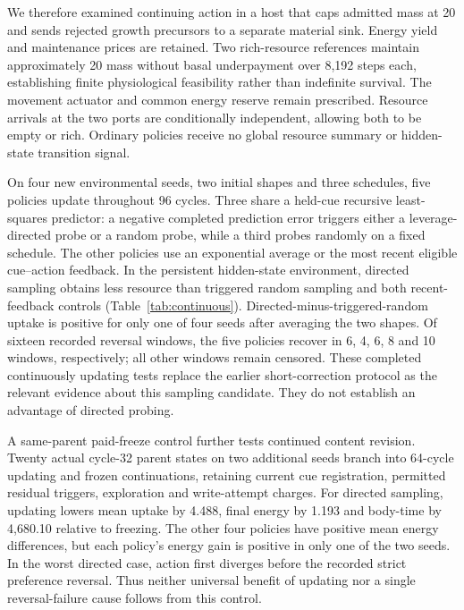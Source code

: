 We therefore examined continuing action in a host that caps admitted mass at 20 and sends rejected growth precursors to a separate material sink. Energy yield and maintenance prices are retained. Two rich-resource references maintain approximately 20 mass without basal underpayment over 8,192 steps each, establishing finite physiological feasibility rather than indefinite survival. The movement actuator and common energy reserve remain prescribed. Resource arrivals at the two ports are conditionally independent, allowing both to be empty or rich. Ordinary policies receive no global resource summary or hidden-state transition signal.

On four new environmental seeds, two initial shapes and three schedules, five policies update throughout 96 cycles. Three share a held-cue recursive least-squares predictor: a negative completed prediction error triggers either a leverage-directed probe or a random probe, while a third probes randomly on a fixed schedule. The other policies use an exponential average or the most recent eligible cue--action feedback. In the persistent hidden-state environment, directed sampling obtains less resource than triggered random sampling and both recent-feedback controls (Table~\ref{tab:continuous}). Directed-minus-triggered-random uptake is positive for only one of four seeds after averaging the two shapes. Of sixteen recorded reversal windows, the five policies recover in 6, 4, 6, 8 and 10 windows, respectively; all other windows remain censored. These completed continuously updating tests replace the earlier short-correction protocol as the relevant evidence about this sampling candidate. They do not establish an advantage of directed probing.



A same-parent paid-freeze control further tests continued content revision. Twenty actual cycle-32 parent states on two additional seeds branch into 64-cycle updating and frozen continuations, retaining current cue registration, permitted residual triggers, exploration and write-attempt charges. For directed sampling, updating lowers mean uptake by 4.488, final energy by 1.193 and body-time by 4,680.10 relative to freezing. The other four policies have positive mean energy differences, but each policy's energy gain is positive in only one of the two seeds. In the worst directed case, action first diverges before the recorded strict preference reversal. Thus neither universal benefit of updating nor a single reversal-failure cause follows from this control.

